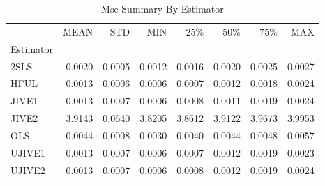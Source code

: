 \begin{table}[ht]
\centering
\caption{Mse Summary By Estimator}
\begin{tabular}{lrrrrrrr}
\toprule
 & MEAN & STD & MIN & 25\% & 50\% & 75\% & MAX \\
Estimator &  &  &  &  &  &  &  \\
\midrule
2SLS & 0.0020 & 0.0005 & 0.0012 & 0.0016 & 0.0020 & 0.0025 & 0.0027 \\
HFUL & 0.0013 & 0.0006 & 0.0006 & 0.0007 & 0.0012 & 0.0018 & 0.0024 \\
JIVE1 & 0.0013 & 0.0007 & 0.0006 & 0.0008 & 0.0011 & 0.0019 & 0.0024 \\
JIVE2 & 3.9143 & 0.0640 & 3.8205 & 3.8612 & 3.9122 & 3.9673 & 3.9953 \\
OLS & 0.0044 & 0.0008 & 0.0030 & 0.0040 & 0.0044 & 0.0048 & 0.0057 \\
UJIVE1 & 0.0013 & 0.0007 & 0.0006 & 0.0007 & 0.0012 & 0.0019 & 0.0023 \\
UJIVE2 & 0.0013 & 0.0007 & 0.0006 & 0.0008 & 0.0012 & 0.0019 & 0.0024 \\
\bottomrule
\end{tabular}
\end{table}
